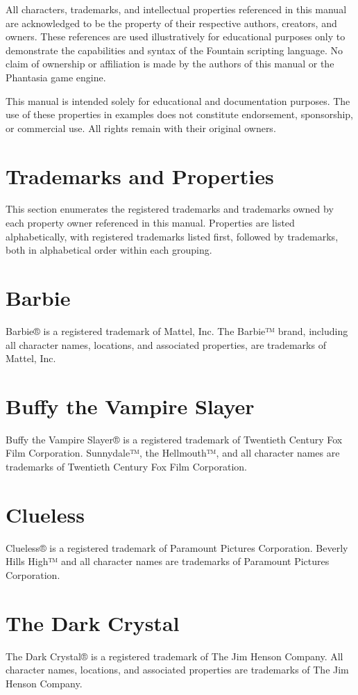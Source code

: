 \documentclass[11pt,letterpaper,oldstylefigures]{memoir}
\begin{document}
All characters, trademarks, and intellectual properties referenced in this manual are acknowledged to be the property of their respective authors, creators, and owners. These references are used illustratively for educational purposes only to demonstrate the capabilities and syntax of the Fountain scripting language. No claim of ownership or affiliation is made by the authors of this manual or the Phantasia game engine.

This manual is intended solely for educational and documentation purposes. The use of these properties in examples does not constitute endorsement, sponsorship, or commercial use. All rights remain with their original owners.

\section{Trademarks and Properties}

This section enumerates the registered trademarks and trademarks owned by each property owner referenced in this manual. Properties are listed alphabetically, with registered trademarks listed first, followed by trademarks, both in alphabetical order within each grouping.

\section{Barbie}
Barbie® is a registered trademark of Mattel, Inc. The Barbie™ brand, including all character names, locations, and associated properties, are trademarks of Mattel, Inc.

\section{Buffy the Vampire Slayer}
Buffy the Vampire Slayer® is a registered trademark of Twentieth Century Fox Film Corporation. Sunnydale™, the Hellmouth™, and all character names are trademarks of Twentieth Century Fox Film Corporation.

\section{Clueless}
Clueless® is a registered trademark of Paramount Pictures Corporation. Beverly Hills High™ and all character names are trademarks of Paramount Pictures Corporation.

\section{The Dark Crystal}
The Dark Crystal® is a registered trademark of The Jim Henson Company. All character names, locations, and associated properties are trademarks of The Jim Henson Company.
\end{document}
